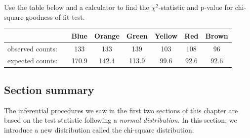 \begin{exercisewrap}
\begin{nexercise}
Use the table below and a calculator to find the $\chi^2$-statistic and p-value for chi-square goodness of fit test.\footnotemark
\begin{center}
\begin{tabular}{ll ccc ccc}
\hline
	 & \hspace{1mm} & Blue & Orange & Green & Yellow & Red & Brown\\
\hline
observed counts:&		& 133 & 133 & 139 & 103 & 108 & 96  \\
expected counts:&		& 170.9 &  142.4 & 113.9 & 99.6 & 92.6 & 92.6\\
\hline
\end{tabular}
\end{center}

\end{nexercise}
\end{exercisewrap}



\textB{\newpage}
\subsection*{Section summary} 
\noindent The inferential procedures we saw in the first two sections of this chapter are based on the test statistic following a \textit{normal distribution}.  In this section, we introduce a new distribution called the chi-square distribution.  

